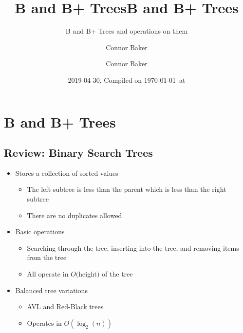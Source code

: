 \documentclass[
  10pt,
  english,
  letterpaper,
,tablecaptionabove
]{scrartcl}
\title{B and B+ Trees}
\subtitle{B and B+ Trees and operations on them}
\author{Connor Baker}
\date{2019-04-30, Compiled on \today~at \currenttime}
\title{B and B+ Trees}
\author{Connor Baker}
\providecommand{\tightlist}{%
  \setlength{\itemsep}{0pt}\setlength{\parskip}{0pt}}
\begin{document}

\begin{titlepage}
\afterpage{\restorepagecolor}
\newcommand{\colorRule}[3][black]{\textcolor[HTML]{#1}{\rule{#2}{#3}}}
\end{titlepage}
\restoregeometry




\hypertarget{b-and-b-trees}{%
\section{B and B+ Trees}\label{b-and-b-trees}}

\hypertarget{review-binary-search-trees}{%
\subsection{Review: Binary Search
Trees}\label{review-binary-search-trees}}

\begin{itemize}
\tightlist
\item
  Stores a collection of sorted values

  \begin{itemize}
  \tightlist
  \item
    The left subtree is less than the parent which is less than the
    right subtree
  \item
    There are no duplicates allowed
  \end{itemize}
\item
  Basic operations

  \begin{itemize}
  \tightlist
  \item
    Searching through the tree, inserting into the tree, and removing
    items from the tree
  \item
    All operate in \(O(\)height\()\) of the tree
  \end{itemize}
\item
  Balanced tree variations

  \begin{itemize}
  \tightlist
  \item
    AVL and Red-Black trees
  \item
    Operates in \(O(\log_2(n))\)
  \end{itemize}
\end{itemize}
\end{document}
